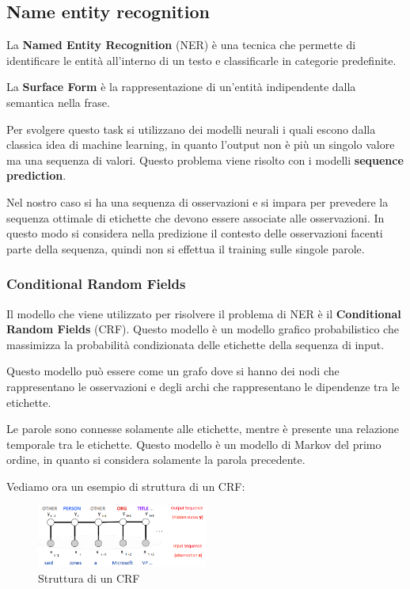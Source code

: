 \subsection{Name entity recognition}
\begin{definizione}
      La \textbf{Named Entity Recognition} (NER) è una tecnica che permette di
      identificare le entità all'interno di un testo e classificarle in categorie
      predefinite.
\end{definizione}
\begin{definizione}
      La \textbf{Surface Form} è la rappresentazione di un'entità indipendente
      dalla semantica nella frase.
\end{definizione}
Per svolgere questo task si utilizzano dei modelli neurali i quali escono dalla
classica idea di machine learning, in quanto l'output non è più un singolo valore
ma una sequenza di valori. Questo problema viene risolto con i modelli \textbf{sequence
      prediction}.

Nel nostro caso si ha una sequenza di osservazioni e si impara per prevedere la
sequenza ottimale di etichette che devono essere associate alle osservazioni.
In questo modo si considera nella predizione il contesto delle osservazioni
facenti parte della sequenza, quindi non si effettua il training sulle singole parole.
\subsubsection{Conditional Random Fields}
Il modello che viene utilizzato per risolvere il problema di NER è il \textbf{Conditional
      Random Fields} (CRF). Questo modello è un modello grafico probabilistico che
massimizza la probabilità condizionata delle etichette della sequenza di input.

Questo modello può essere come un grafo dove si hanno dei nodi che rappresentano
le osservazioni e degli archi che rappresentano le dipendenze tra le etichette.

Le parole sono connesse solamente alle etichette, mentre è presente una relazione
temporale tra le etichette. Questo modello è un modello di Markov del primo ordine,
in quanto si considera solamente la parola precedente.

Vediamo ora un esempio di struttura di un CRF:
\begin{figure}[!ht]
      \centering
      \includegraphics[width=0.5\textwidth]{./img/nlp/crf.png}
      \caption{Struttura di un CRF}
      \label{fig:crf}
\end{figure}

